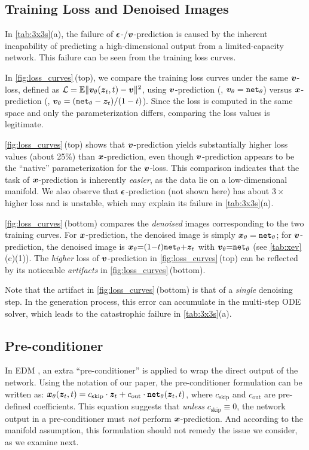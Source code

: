 \subsection{Training Loss and Denoised Images}

In \cref{tab:3x3s}(a), the failure of $\bm{\epsilon}$-/$\bm{v}$-prediction is caused by the inherent incapability of predicting a high-dimensional output from a limited-capacity network. This failure can be seen from the training loss curves.

In \cref{fig:loss_curves}\,(top), we compare the training loss curves under the same $\bm{v}$-loss, defined as $\mathcal{L}=\mathbb{E} \| \bm{v}_\theta(\bm{z}_t, t) - \bm{v} \|^2$, using $\bm{v}$-prediction (\ie, $\bm{v}_\theta=\text{\texttt{net}}_\theta$) versus $\bm{x}$-prediction (\ie, $\bm{v}_\theta=(\text{\texttt{net}}_\theta - \bm{z}_t)/(1-t)$). Since the loss is computed in the same space and only the parameterization differs, comparing the loss values is legitimate.

\cref{fig:loss_curves}\,(top) shows that $\bm{v}$-prediction yields substantially higher loss values (about 25\%) than $\bm{x}$-prediction, even though $\bm{v}$-prediction appears to be the ``native'' parameterization for the $\bm{v}$-loss. This comparison indicates that the task of $\bm{x}$-prediction is inherently \textit{easier}, as the data lie on a low-dimensional manifold. We also observe that $\bm{\epsilon}$-prediction (not shown here) has about $3\times$ higher loss and is unstable, which may explain its failure in \cref{tab:3x3s}(a).

\cref{fig:loss_curves}\,(bottom) compares the \textit{denoised} images corresponding to the two training curves. For $\bm{x}$-prediction, the denoised image is simply $\bm{x}_\theta=\text{\texttt{net}}_\theta$; for $\bm{v}$-prediction, the denoised image is $\bm{x}_\theta{=}(1{-}t){\text{\texttt{net}}_\theta}{+} \bm{z}_t$ with $\bm{v}_\theta{=}\text{\texttt{net}}_\theta$ (see \cref{tab:xev}(c)(1)). The \textit{higher} loss of $\bm{v}$-prediction in \cref{fig:loss_curves}\,(top) can be reflected by its noticeable \textit{artifacts} in \cref{fig:loss_curves}\,(bottom).

Note that the artifact in \cref{fig:loss_curves}\,(bottom) is that of a \textit{single} denoising step. In the generation process, this error can accumulate in the multi-step ODE solver, which leads to the catastrophic failure in \cref{tab:3x3s}(a).

\subsection{Pre-conditioner}

In EDM \cite{Karras2022edm}, an extra ``pre-conditioner'' is applied to wrap the direct output of the network. Using the notation of our paper, the pre-conditioner formulation can be written as:
$\bm{x}_\theta(\bm{z}_t, t) = c_\text{skip} \cdot \bm{z}_t + c_\text{out}\cdot \text{\texttt{net}}_\theta(\bm{z}_t, t)$,
where $c_\text{skip}$ and $c_\text{out}$ are pre-defined coefficients.
This equation suggests that \textit{unless} $c_\text{skip}\equiv0$, the network output in a pre-conditioner must \textit{not} perform $\bm{x}$-prediction. And according to the manifold assumption, this formulation should not remedy the issue we consider, as we examine next.

